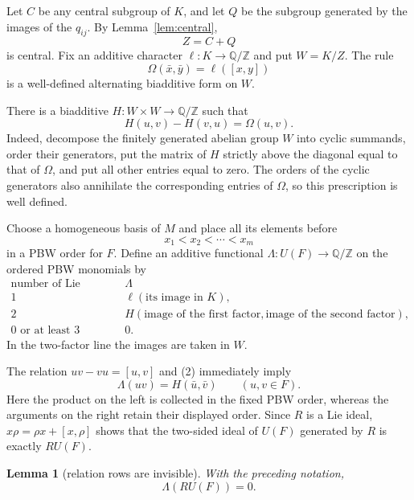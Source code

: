 \documentclass[11pt]{amsart}
\newtheorem{lemma}[theorem]{Lemma}
\theoremstyle{remark}
\newcommand{\Z}{\mathbb Z}
\newcommand{\Q}{\mathbb Q}
\begin{document}
Let $C$ be any central subgroup of $K$, and let $Q$ be the subgroup
generated by the images of the $q_{ij}$.  By
Lemma~\ref{lem:central},
\[
                              Z=C+Q
\]
is central.  Fix an additive character $\ell:K\to\Q/\Z$ and put
$W=K/Z$.  The rule
\[
 \Omega(\bar x,\bar y)=\ell([x,y])                    \tag{1}
\]
is a well-defined alternating biadditive form on $W$.

There is a biadditive $H:W\times W\to\Q/\Z$ such that
\[
 H(u,v)-H(v,u)=\Omega(u,v).                            \tag{2}
\]
Indeed, decompose the finitely generated abelian group $W$ into cyclic
summands, order their generators, put the matrix of $H$ strictly above
the diagonal equal to that of $\Omega$, and put all other entries equal
to zero.  The orders of the cyclic generators also annihilate the
corresponding entries of $\Omega$, so this prescription is well defined.

Choose a homogeneous basis of $M$ and place all its elements before
\[
                         x_1<x_2<\cdots<x_m              \tag{3}
\]
in a PBW order for $F$.  Define an additive functional
$\Lambda:U(F)\to\Q/\Z$ on the ordered PBW monomials by
\[
 \begin{array}{c|c}
 \text{number of Lie factors}&\Lambda\\ \hline
 1&\ell(\text{its image in }K),\\
 2&H(\text{image of the first factor},
       \text{image of the second factor}),\\
 0\text{ or at least }3&0.
 \end{array}                                             \tag{4}
\]
In the two-factor line the images are taken in $W$.

The relation $uv-vu=[u,v]$ and (2) immediately imply
\begin{equation}
             \Lambda(uv)=H(\bar u,\bar v)
             \qquad(u,v\in F).                          \tag{5}
\end{equation}
Here the product on the left is collected in the fixed PBW order,
whereas the arguments on the right retain their displayed order.
Since $R$ is a Lie ideal, $x\rho=\rho x+[x,\rho]$ shows that the
two-sided ideal of $U(F)$ generated by $R$ is exactly $RU(F)$.

\begin{lemma}[relation rows are invisible]\label{lem:rows}
With the preceding notation,
\[
                              \Lambda(RU(F))=0.
\]
\end{lemma}
\end{document}
